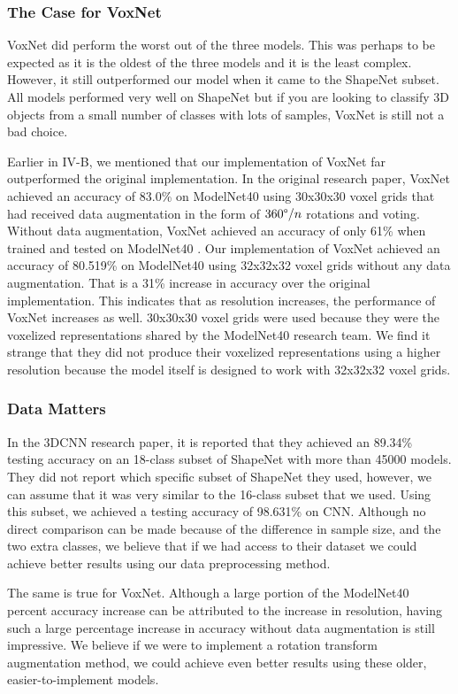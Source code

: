 \documentclass[conference]{IEEEtran}
\begin{document}
\subsubsection{The Case for VoxNet}
VoxNet did perform the worst out of the three models. This was perhaps to be expected as it is the oldest of the three models and it is the least complex. However, it still outperformed our model when it came to the ShapeNet subset. All models performed very well on ShapeNet but if you are looking to classify 3D objects from a small number of classes with lots of samples, VoxNet is still not a bad choice.

Earlier in IV-B, we mentioned that our implementation of VoxNet far outperformed the original implementation. In the original research paper, VoxNet achieved an accuracy of 83.0\% on ModelNet40 using 30x30x30 voxel grids that had received data augmentation in the form of $360\degree/n$ rotations and voting. Without data augmentation, VoxNet achieved an accuracy of only 61\% when trained and tested on ModelNet40 \cite{7353481}. Our implementation of VoxNet achieved an accuracy of 80.519\% on ModelNet40 using 32x32x32 voxel grids without any data augmentation. That is a 31\% increase in accuracy over the original implementation. This indicates that as resolution increases, the performance of VoxNet increases as well. 30x30x30 voxel grids were used because they were the voxelized representations shared by the ModelNet40 research team. We find it strange that they did not produce their voxelized representations using a higher resolution because the model itself is designed to work with 32x32x32 voxel grids.

\subsubsection{Data Matters}
In the 3DCNN research paper, it is reported that they achieved an 89.34\% testing accuracy on an 18-class subset of ShapeNet with more than 45000 models\cite{gwak20153d}. They did not report which specific subset of ShapeNet they used, however, we can assume that it was very similar to the 16-class subset that we used. Using this subset, we achieved a testing accuracy of 98.631\% on CNN. Although no direct comparison can be made because of the difference in sample size, and the two extra classes, we believe that if we had access to their dataset we could achieve better results using our data preprocessing method. 

The same is true for VoxNet. Although a large portion of the ModelNet40 percent accuracy increase can be attributed to the increase in resolution, having such a large percentage increase in accuracy without data augmentation is still impressive. We believe if we were to implement a rotation transform augmentation method, we could achieve even better results using these older, easier-to-implement models.
\end{document}
